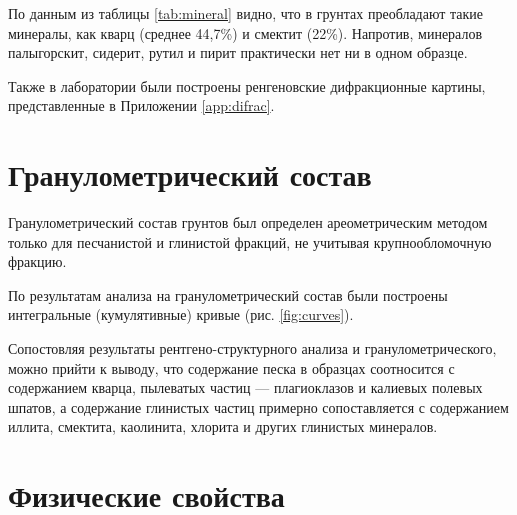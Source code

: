 По данным из таблицы \ref{tab:mineral} видно, что в грунтах преобладают такие 
минералы, как кварц (среднее 44,7\%) и смектит (22\%). Напротив, минералов 
палыгорскит, сидерит, рутил и пирит практически нет ни в одном образце. 

Также в лаборатории были построены ренгеновские дифракционные 
картины, представленные в Приложении \ref{app:difrac}. 

\section{Гранулометрический состав}

Гранулометрический состав грунтов был определен ареометрическим 
методом только для песчанистой и глинистой фракций, не учитывая 
крупнообломочную фракцию. 

По результатам анализа на гранулометрический состав были 
построены интегральные (кумулятивные) кривые (рис. \ref{fig:curves}).

{
\small

}


Сопостовляя результаты рентгено-структурного анализа и гранулометрического, 
можно прийти к выводу, что содержание песка в образцах соотносится с 
содержанием кварца, пылеватых частиц --- плагиоклазов и калиевых
полевых шпатов, а содержание глинистых частиц примерно сопоставляется с 
содержанием иллита, смектита, каолинита, хлорита и других глинистых минералов.

\section{Физические свойства}

